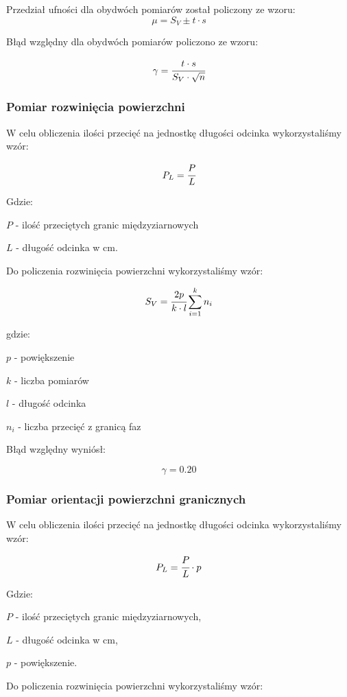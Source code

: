 \documentclass[a4paper,12pt]{article}
\begin{document}
Przedział ufności dla obydwóch pomiarów został policzony ze wzoru:
$$\mu = S_V\pm t\cdot s$$
\newline 

Błąd względny dla obydwóch pomiarów policzono ze wzoru:

$$\gamma=\cfrac{t\cdot s}{S_V\cdot \sqrt{n}}$$

\subsubsection{Pomiar rozwinięcia powierzchni}

W celu obliczenia ilości przecięć na jednostkę długości odcinka wykorzystaliśmy wzór:

$$P_L=\cfrac{P}{L}$$

Gdzie:

$P$ - ilość przeciętych granic międzyziarnowych

$L$ - długość odcinka w cm.
\newline

Do policzenia rozwinięcia powierzchni wykorzystaliśmy wzór:

$$S_V=\cfrac{2p}{k\cdot l} \sum ^k_{i=1}n_i$$

gdzie:

$p$ - powiększenie

$k$ - liczba pomiarów

$l$ - długość odcinka

$n_i$ - liczba przecięć z granicą faz



Błąd względny wyniósł:

$$\gamma=0.20$$

\subsubsection{Pomiar orientacji powierzchni granicznych}

W celu obliczenia ilości przecięć na jednostkę długości odcinka wykorzystaliśmy wzór:

$$P_L=\cfrac{P}{L} \cdot p$$

Gdzie:

$P$ - ilość przeciętych granic międzyziarnowych,

$L$ - długość odcinka w cm,

$p$ - powiększenie.
\newline

Do policzenia rozwinięcia powierzchni wykorzystaliśmy wzór:
\end{document}

